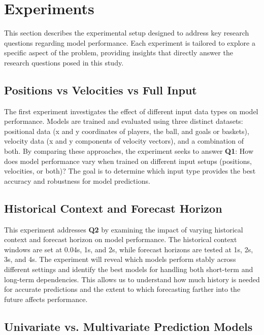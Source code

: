 \section{Experiments}
\label{sec:experiments}

This section describes the experimental setup designed to address key research questions regarding model performance. Each experiment is tailored to explore a specific aspect of the problem, providing insights that directly answer the research questions posed in this study.

\subsection{Positions vs Velocities vs Full Input}

The first experiment investigates the effect of different input data types on model performance. Models are trained and evaluated using three distinct datasets: positional data (x and y coordinates of players, the ball, and goals or baskets), velocity data (x and y components of velocity vectors), and a combination of both. By comparing these approaches, the experiment seeks to answer \textbf{Q1}: How does model performance vary when trained on different input setups (positions, velocities, or both)? The goal is to determine which input type provides the best accuracy and robustness for model predictions.

\subsection{Historical Context and Forecast Horizon}

This experiment addresses \textbf{Q2} by examining the impact of varying historical context and forecast horizon on model performance. The historical context windows are set at 0.04s, 1s, and 2s, while forecast horizons are tested at 1s, 2s, 3s, and 4s. The experiment will reveal which models perform stably across different settings and identify the best models for handling both short-term and long-term dependencies. This allows us to understand how much history is needed for accurate predictions and the extent to which forecasting farther into the future affects performance.

\subsection{Univariate vs. Multivariate Prediction Models}


